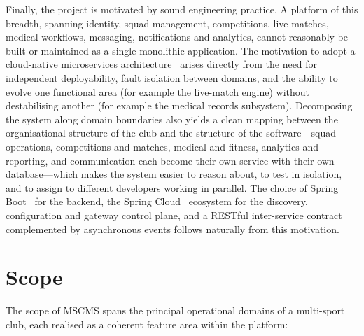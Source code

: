 Finally, the project is motivated by sound engineering practice. A platform of this breadth,
spanning identity, squad management, competitions, live matches, medical workflows,
messaging, notifications and analytics, cannot reasonably be built or maintained as a single
monolithic application. The motivation to adopt a cloud-native microservices
architecture~\cite{microservices} arises directly from the need for independent
deployability, fault isolation between domains, and the ability to evolve one functional area
(for example the live-match engine) without destabilising another (for example the medical
records subsystem). Decomposing the system along domain boundaries also yields a clean
mapping between the organisational structure of the club and the structure of the
software---squad operations, competitions and matches, medical and fitness, analytics and
reporting, and communication each become their own service with their own database---which
makes the system easier to reason about, to test in isolation, and to assign to different
developers working in parallel. The choice of Spring Boot~\cite{springboot} for the backend,
the Spring Cloud~\cite{springcloud} ecosystem for the discovery, configuration and gateway
control plane, and a RESTful inter-service contract~\cite{restapi} complemented by
asynchronous events follows naturally from this motivation.

\section{Scope}
\label{sec:scope}

The scope of MSCMS spans the principal operational domains of a multi-sport club, each
realised as a coherent feature area within the platform:


